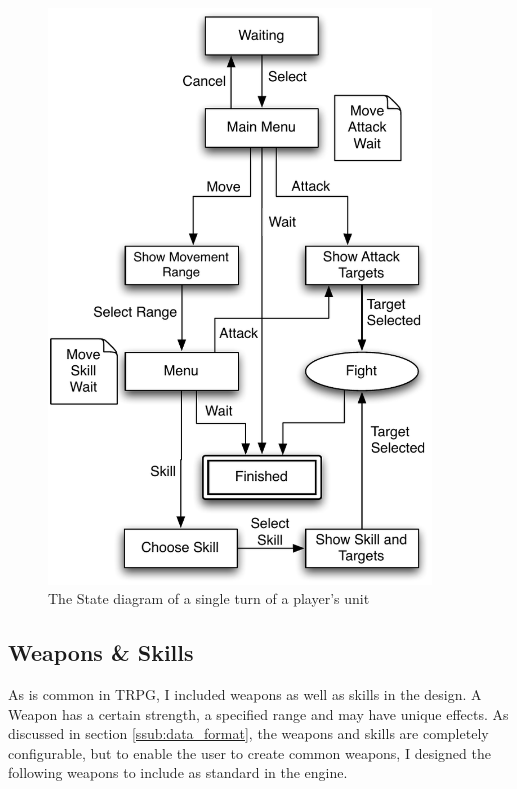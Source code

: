 
\begin{figure}[h]
	\centering
		\includegraphics[width=4in]{figures/unit.pdf}
	\caption{The State diagram of a single turn of a player's unit}
	\label{fig:figures_unit}
\end{figure}

\clearpage
\subsection{Weapons \& Skills}
\label{sub:weapons___skills}


As is common in TRPG, I included weapons as  well as skills in the design.  A Weapon has a certain strength, a specified range and may have unique effects.  As discussed in  section \ref{ssub:data_format},  the weapons and skills are completely configurable, but to enable the user to create common weapons, I designed the following weapons to include as standard in the engine.  

